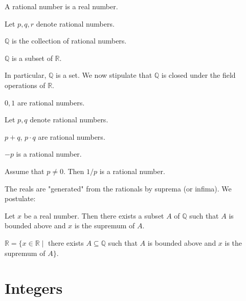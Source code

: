 \documentclass{article}
\begin{document}
\begin{forthel}
\begin{signature}
A rational number is a real number.
\end{signature}

Let $p,q,r$ denote rational numbers.

\begin{definition}
$\mathbb{Q}$ is the collection of rational numbers.
\end{definition}

\begin{theorem}
$\mathbb{Q}$ is a subset of $\mathbb{R}$.
\end{theorem}
\end{forthel}
%
In particular, $\mathbb{Q}$ is a set.
We now stipulate that $\mathbb{Q}$ is closed under the
field operations of $\mathbb{R}$.
%
\begin{forthel}
\begin{axiom}
$0,1$ are rational numbers.
\end{axiom}

Let $p,q$ denote rational numbers.

\begin{axiom}
$p + q$, $p \cdot q$ are rational numbers.
\end{axiom}

\begin{axiom}
$-p$ is a rational number.
\end{axiom}

\begin{axiom}
Assume that $p \neq 0$. Then
$1/p$ is a rational number.
\end{axiom}
\end{forthel}
%
The reals are "generated" from 
the rationals by suprema (or infima). We postulate:
%
\begin{forthel}
\begin{axiom} Let $x$ be a real number.
Then there exists a subset $A$ of $\mathbb{Q}$
such that $A$ is bounded above and
$x$ is the supremum of $A$.
\end{axiom}

\begin{theorem}
$\mathbb{R} = \{x \in \mathbb{R} \mid$ there exists $
A \subseteq \mathbb{Q}$ such that $
A$ is bounded above and $x$ is the supremum of $A\}$.
\end{theorem}
\end{forthel}


\section{Integers}
\end{document}

